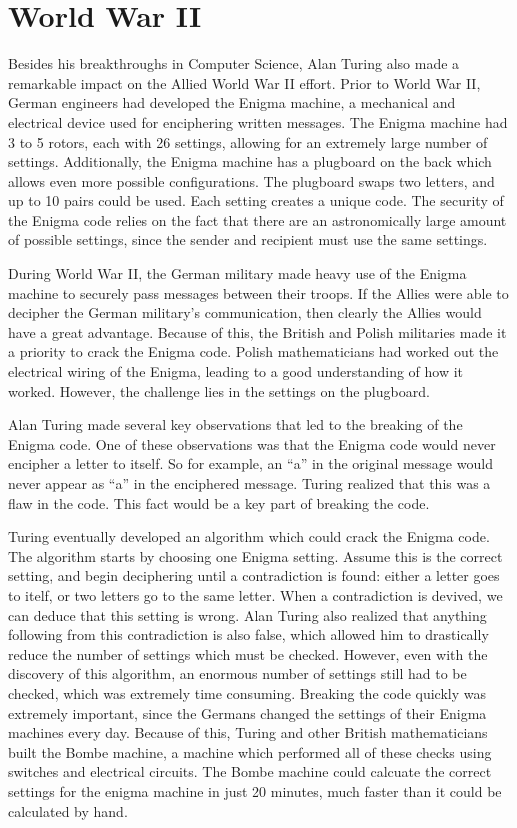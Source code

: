 \documentclass[12pt]{article}
\theoremstyle{mystyle}
\begin{document}
\section{World War II}

Besides his breakthroughs in Computer Science, Alan Turing also made a
remarkable impact on the Allied World War II effort. Prior to World War II,
German engineers had developed the Enigma machine, a mechanical and electrical 
device used for enciphering written messages. The Enigma machine had 3 to 5
rotors, each with 26 settings, allowing for an extremely large number of
settings. Additionally, the Enigma machine has a plugboard on the back which 
allows even more possible configurations. The plugboard swaps two letters, and 
up to 10 pairs could be used. Each setting creates a unique code. The security 
of the Enigma code relies on the fact that there are an astronomically large 
amount of possible settings, since the sender and recipient must use the same
settings.

During World War II, the German military made heavy use of the Enigma machine to
securely pass messages between their troops. If the Allies were able to decipher
the German military's communication, then clearly the Allies would have a great
advantage. Because of this, the British and Polish militaries made it a priority
to crack the Enigma code. Polish mathematicians had worked out the electrical
wiring of the Enigma, leading to a good understanding of how it worked. 
However, the challenge lies in the settings on the plugboard.

Alan Turing made several key observations that led to the breaking of the Enigma
code. One of these observations was that the Enigma code would never encipher a 
letter to itself. So for example, an ``a'' in the original message would never
appear as ``a'' in the enciphered message. Turing realized that this was a flaw
in the code. This fact would be a key part of breaking the code.

Turing eventually developed an algorithm which could crack the Enigma code. The 
algorithm starts by choosing one Enigma setting. Assume this is the correct
setting, and begin deciphering until a contradiction is found: either a letter
goes to itelf, or two letters go to the same letter. When a contradiction is
devived, we can deduce that this setting is wrong. Alan Turing also realized
that anything following from this contradiction is also false, which allowed
him to drastically reduce the number of settings which must be checked. However,
even with the discovery of this algorithm, an enormous number of settings still
had to be checked, which was extremely time consuming. Breaking the code quickly
was extremely important, since the Germans changed the settings of their Enigma
machines every day. Because of this, Turing and other British mathematicians
built the Bombe machine, a machine which performed all of these checks using 
switches and electrical circuits. The Bombe machine could calcuate the correct
settings for the enigma machine in just 20 minutes, much faster than it could be
calculated by hand.
\end{document}
